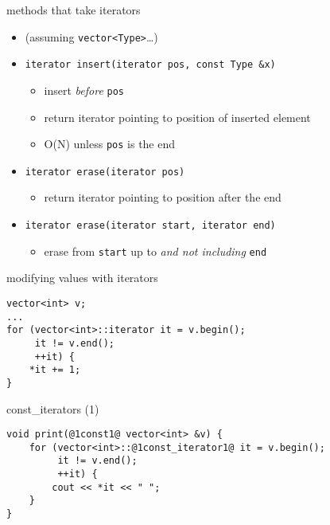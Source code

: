 \begin{frame}[fragile,label=moreItMethods]{methods that take iterators}
\lstset{
    language=C++,
    style=smaller
}
\begin{itemize}
\item (assuming \lstinline|vector<Type>|\ldots)
\item \lstinline|iterator insert(iterator pos, const Type &x)|
\begin{itemize}
    \item insert \textit{before} \texttt{pos}
    \item return iterator pointing to position of inserted element
    \item O(N) unless \texttt{pos} is the end
\end{itemize}
\item \lstinline|iterator erase(iterator pos)| 
    \begin{itemize}
    \item return iterator pointing to position after the end
    \end{itemize}
\item \lstinline|iterator erase(iterator start, iterator end)| 
    \begin{itemize}
        \item erase from \texttt{start} up to \textit{and not including} \texttt{end}
    \end{itemize}
\end{itemize}
\end{frame}

\begin{frame}[fragile,label=modWithIt]{modifying values with iterators}
\lstset{language=C++,style=small}
\begin{lstlisting}
vector<int> v;
...
for (vector<int>::iterator it = v.begin();
     it != v.end();
     ++it) {
    *it += 1;
}
\end{lstlisting}
\end{frame}

\begin{frame}[fragile,label=constIt1]{const\_iterators (1)}
\begin{lstlisting}
void print(@1const1@ vector<int> &v) {
    for (vector<int>::@1const_iterator1@ it = v.begin();
         it != v.end();
         ++it) {
        cout << *it << " ";
    }
}
\end{lstlisting}
\end{frame}


